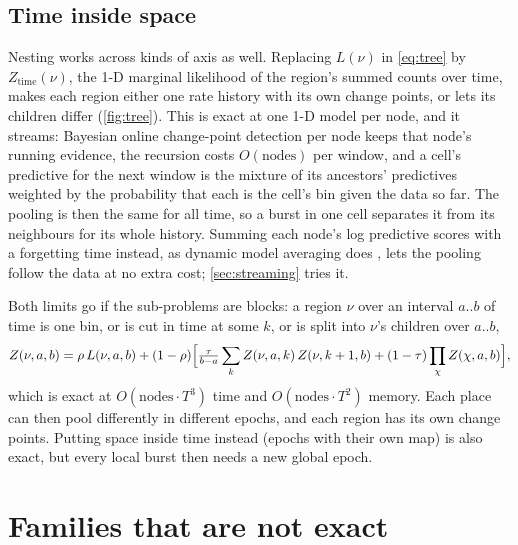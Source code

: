 \documentclass[11pt,a4paper]{article}
\begin{document}
\subsection{Time inside space}\label{sec:spacetime}

Nesting works across kinds of axis as well. Replacing $L(\nu)$ in \cref{eq:tree} by
$Z_{\text{time}}(\nu)$, the 1-D marginal likelihood of the region's summed counts over time, makes
each region either one rate history with its own change points, or lets its children differ
(\cref{fig:tree}). This is exact at one 1-D model per node, and it streams: Bayesian online
change-point detection \citep{adams2007bayesian,fearnhead2007online} per node keeps that node's
running evidence, the recursion costs $O(\text{nodes})$ per window, and a cell's predictive for
the next window is the mixture of its ancestors' predictives weighted by the probability that
each is the cell's bin given the data so far. The pooling is then the same for all time, so a
burst in one cell separates it from its neighbours for its whole history. Summing each node's log
predictive scores with a forgetting time instead, as dynamic model averaging does
\citep{raftery2010online}, lets the pooling follow the data at no extra cost; \cref{sec:streaming}
tries it.

Both limits go if the sub-problems are blocks: a region $\nu$ over an interval $a..b$ of time is one
bin, or is cut in time at some $k$, or is split into $\nu$'s children over $a..b$,
\begin{equation}
  Z(\nu, a, b) = \rho\, L(\nu, a, b) + (1-\rho)\Bigl[\tfrac{\tau}{b-a}\sum_{k} Z(\nu, a, k)\, Z(\nu, k+1, b)
                 + (1-\tau) \prod_{\chi} Z(\chi, a, b)\Bigr],
  \label{eq:blocks}
\end{equation}
which is exact at $O(\text{nodes} \cdot T^3)$ time and $O(\text{nodes} \cdot T^2)$ memory. Each place
can then pool differently in different epochs, and each region has its own change points. Putting
space inside time instead (epochs with their own map) is also exact, but every local burst then
needs a new global epoch.

\section{Families that are not exact}\label{sec:notexact}
\end{document}
